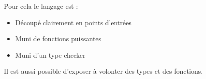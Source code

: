 \documentclass[french,xcolor={usenames,dvipsnames}]{beamer}
\begin{document}
\begin{frame}
  Pour cela le langage est :
  \vspace{10pt}
  \begin{itemize}
    \item Découpé clairement en points d'entrées 

    \vspace{10pt}

    \item Muni de fonctions puissantes

    \vspace{10pt}

    \item Muni d'un type-checker
  \end{itemize}

  \vspace{10pt}

  Il est aussi possible d'exposer à volonter des types et des fonctions.
\end{frame}
\end{document}
